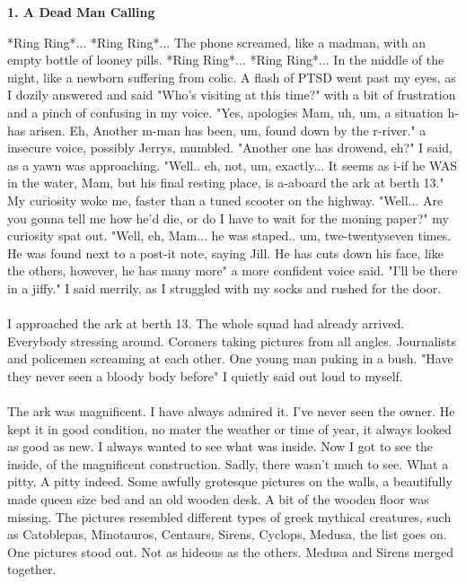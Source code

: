 \documentclass[]{article}
\begin{document}
\begin{center}
	\large\textbf{1. A Dead Man Calling}
\end{center}

*Ring Ring*... *Ring Ring*... The phone screamed, like a madman, with an empty bottle of looney pills. *Ring Ring*... *Ring Ring*... In the middle of the night, like a newborn suffering from colic. A flash of PTSD went past my eyes, as I dozily answered and said "Who's visiting at this time?" with a bit of frustration and a pinch of confusing in my voice. "Yes, apologies Mam, uh, um, a situation h-has arisen. Eh, Another m-man has been, um, found down by the r-river." a insecure voice, possibly Jerrys, mumbled. "Another one has drowend, eh?" I said, as a yawn was approaching. "Well.. eh, not, um, exactly... It seems as i-if he WAS in the water, Mam, but his final resting place, is a-aboard the ark at berth 13." My curiosity woke me, faster than a tuned scooter on the highway. "Well... Are you gonna tell me how he'd die, or do I have to wait for the moning paper?" my curiosity spat out. "Well, eh, Mam... he was staped.. um, twe-twentyseven times. He was found next to a post-it note, saying Jill. He has cuts down his face, like the others, however, he has many more" a more confident voice said. "I'll be there in a jiffy." I said merrily, as I struggled with my socks and rushed for the door.
\\ \\
I approached the ark at berth 13. The whole squad had already arrived. Everybody stressing around. Coroners taking pictures from all angles. Journalists and policemen screaming at each other. One young man puking in a bush. "Have they never seen a bloody body before" I quietly said out loud to myself. 
\\ \\
The ark was magnificent. I have always admired it. I've never seen the owner. He kept it in good condition, no mater the weather or time of year, it always looked as good as new. I always wanted to see what was inside. Now I got to see the inside, of the magnificent construction. Sadly, there wasn't much to see. What a pitty. A pitty indeed. Some awfully grotesque pictures on the walls, a beautifully made queen size bed and an old wooden desk. A bit of the wooden floor was missing. The pictures resembled different types of greek mythical creatures, such as Catoblepas, Minotauros, Centaurs, Sirens, Cyclops, Medusa, the list goes on. One pictures stood out. Not as hideous as the others. Medusa and Sirens merged together.
\end{document}
